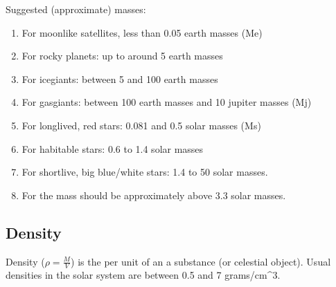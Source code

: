 \documentclass[letterpaper,10pt,english]{sphinxmanual}
\begin{document}
\sphinxAtStartPar
Suggested (approximate) masses:
\begin{enumerate}
%
\item {} 
\sphinxAtStartPar
For moon\sphinxhyphen{}like satellites, less than 0.05 earth masses (Me)

\item {} 
\sphinxAtStartPar
For rocky planets: up to around 5 earth masses

\item {} 
\sphinxAtStartPar
For ice\sphinxhyphen{}giants: between 5 and 100 earth masses

\item {} 
\sphinxAtStartPar
For gas\sphinxhyphen{}giants: between 100 earth masses and 10 jupiter masses (Mj)

\item {} 
\sphinxAtStartPar
For long\sphinxhyphen{}lived, red stars: 0.081 and 0.5 solar masses (Ms)

\item {} 
\sphinxAtStartPar
For habitable stars: 0.6 to 1.4 solar masses

\item {} 
\sphinxAtStartPar
For short\sphinxhyphen{}live, big blue/white stars: 1.4 to 50 solar masses.

\item {} 
\sphinxAtStartPar
For {\hyperref[\detokenize{celestial_bodies/black_hole:id1}]{}} the mass should be approximately above 3.3 solar masses.

\end{enumerate}


\subsection{Density}
\label{\detokenize{quantities/material/density:density}}\label{\detokenize{quantities/material/density::doc}}\label{\detokenize{quantities/material/density:id1}}
\sphinxAtStartPar
Density (\(\rho = \frac{M}{V}\)) is the {\hyperref[\detokenize{quantities/material/mass:id1}]{}} per unit {\hyperref[\detokenize{quantities/geometric/volume:id1}]{}} of an a substance (or celestial object).
Usual densities in the solar system are between 0.5 and 7 grams/cm\textasciicircum{}3.
\end{document}
